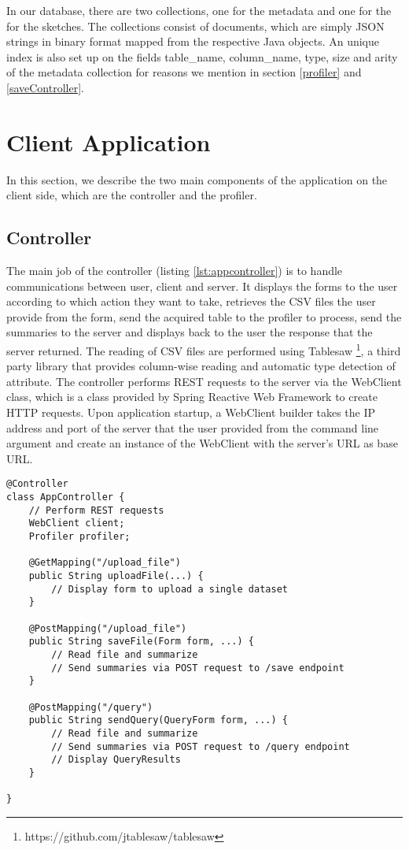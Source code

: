 In our database, there are two collections, one for the metadata and one for the for the sketches. The collections consist of documents, which are simply JSON strings in binary format mapped from the respective Java objects. An unique index is also set up on the fields table\_name, column\_name, type, size and arity of the metadata collection for reasons we mention in section \ref{profiler} and \ref{saveController}.

\section{Client Application}

In this section, we describe the two main components of the application on the client side, which are the controller and the profiler.

\subsection{Controller}

The main job of the controller (listing \ref{lst:appcontroller}) is to handle communications between user, client and server. It displays the forms to the user according to which action they want to take, retrieves the CSV files the user provide from the form, send the acquired table to the profiler to process, send the summaries to the server and displays back to the user the response that the server returned. The reading of CSV files are performed using Tablesaw \footnote{https://github.com/jtablesaw/tablesaw}, a third party library that provides column-wise reading and automatic type detection of attribute. The controller performs REST requests to the server via the WebClient class, which is a class provided by Spring Reactive Web Framework to create HTTP requests. Upon application startup, a WebClient builder takes the IP address and port of the server that the user provided from the command line argument and create an instance of the WebClient with the server's URL as base URL.

\begin{lstlisting}[caption={Preview of the controller class}, label=lst:appcontroller]
@Controller
class AppController {
    // Perform REST requests
    WebClient client;
    Profiler profiler;

    @GetMapping("/upload_file")
    public String uploadFile(...) {
        // Display form to upload a single dataset
    }

    @PostMapping("/upload_file")
    public String saveFile(Form form, ...) {
        // Read file and summarize
        // Send summaries via POST request to /save endpoint
    }

    @PostMapping("/query")
    public String sendQuery(QueryForm form, ...) {
        // Read file and summarize
        // Send summaries via POST request to /query endpoint
        // Display QueryResults
    }
    
}
\end{lstlisting}

